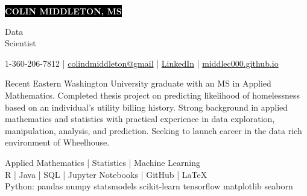 \documentclass[11pt]{developercv} %
\newcommand{\vsp}{\vspace{-10pt}}
\begin{document}
\setlength{\abovedisplayskip}{0pt}
\setlength{\belowdisplayskip}{0pt}

\begin{minipage}{0.75\textwidth}
	\colorbox{black}{{\HUGE\textcolor{white}{\textbf{\MakeUppercase{Colin Middleton, MS}}}}}
\end{minipage}
\begin{minipage}{0.25\textwidth}
	{\huge Data \\Scientist}
\end{minipage}

\vspace{-5pt}
\begin{center}
	1-360-206-7812
	\hspace{0.25cm} | \hspace{0.25cm}
	\href{mailto:colindmiddleton@gmail.com}{colindmiddleton@gmail}
	\hspace{0.25cm} | \hspace{0.25cm}
	\href{https://www.linkedin.com/in/colin-middleton-000/}{LinkedIn}
	\hspace{0.25cm} | \hspace{0.25cm}
	\href{https://middlec000.github.io/}{middlec000.github.io}
\end{center}
\vsp


Recent Eastern Washington University graduate with an MS in Applied Mathematics. Completed thesis project on predicting likelihood of homelessness based on an individual's utility billing history. Strong background in applied mathematics and statistics with practical experience in data exploration, manipulation, analysis, and prediction. Seeking to launch career in the data rich environment of Wheelhouse.

\vsp
\begin{center}
	Applied Mathematics \quad | \quad Statistics \quad | \quad Machine Learning
	\\
	\vspace{0.25cm}
	R \quad | \quad Java \quad | \quad SQL \quad | \quad
	Jupyter Notebooks \quad | \quad GitHub \quad | \quad LaTeX
	\\
	\vspace{0.25cm}
	Python: \quad pandas \quad numpy \quad statsmodels \quad scikit-learn \quad tensorflow \quad matplotlib \quad seaborn
\end{center}
\vsp
\end{document}
